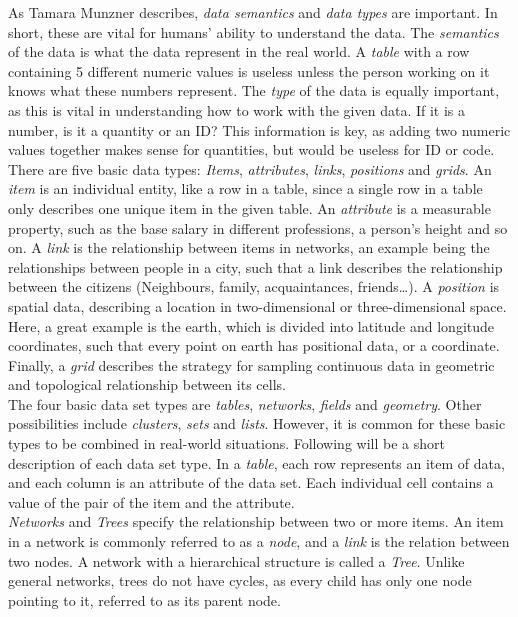 \documentclass[Report.tex]{subfiles}
\begin{document}
As Tamara Munzner describes, \emph{data semantics} and \emph{data types} are important. In short, these are vital for humans’ ability to understand the data. The \emph{semantics} of the data is what the data represent in the real world. A \emph{table} with a row containing 5 different numeric values is useless unless the person working on it knows what these numbers represent. The \emph{type} of the data is equally important, as this is vital in understanding how to work with the given data. If it is a number, is it a quantity or an ID? This information is key, as adding two numeric values together makes sense for quantities, but would be useless for ID or code.\\
There are five basic data types: \emph{Items}, \emph{attributes}, \emph{links}, \emph{positions} and \emph{grids}. An \emph{item} is an individual entity, like a row in a table, since a single row in a table only describes one unique item in the given table. An \emph{attribute} is a measurable property, such as the base salary in different professions, a person’s height and so on. A \emph{link} is the relationship between items in networks, an example being the relationships between people in a city, such that a link describes the relationship between the citizens (Neighbours, family, acquaintances, friends…). A \emph{position} is spatial data, describing a location in two-dimensional or three-dimensional space. Here, a great example is the earth, which is divided into latitude and longitude coordinates, such that every point on earth has positional data, or a coordinate. Finally, a \emph{grid} describes the strategy for sampling continuous data in geometric and topological relationship between its cells.\\
The four basic data set types are \emph{tables}, \emph{networks}, \emph{fields} and \emph{geometry}. Other possibilities include \emph{clusters}, \emph{sets} and \emph{lists}. However, it is common for these basic types to be combined in real-world situations. Following will be a short description of each data set type. 
In a \emph{table}, each row represents an item of data, and each column is an attribute of the data set. Each individual cell contains a value of the pair of the item and the attribute.\\

\emph{Networks} and \emph{Trees} specify the relationship between two or more items. An item in a network is commonly referred to as a \emph{node}, and a \emph{link} is the relation between two nodes. 
A network with a hierarchical structure is called a \emph{Tree}. Unlike general networks, trees do not have cycles, as every child has only one node pointing to it, referred to as its parent node.\\
\end{document}
